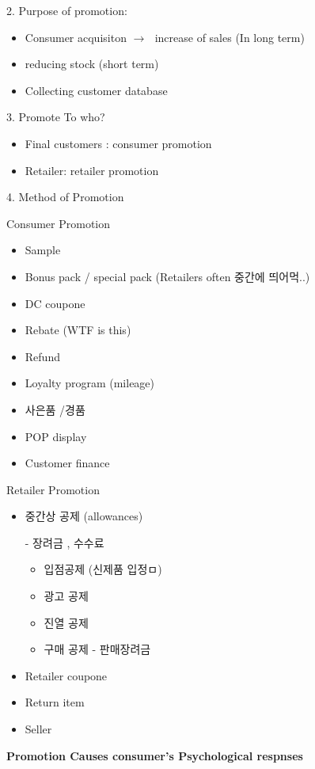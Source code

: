 \documentclass[12pt]{article}
\newcommand{\ra}{$\rightarrow \text{ }$}
\newcommand{\tb}{\textbf}
\begin{document}
\begin{itemize}
2. Purpose of promotion:
\begin{itemize}
	\item Consumer acquisiton \ra increase of sales (In long term)
	\item reducing stock (short term)
	\item Collecting customer database
\end{itemize}

3. Promote To who?

\begin{itemize}
	\item Final customers : consumer promotion
	\item Retailer: retailer promotion
\end{itemize}

4. Method of Promotion

Consumer Promotion
\begin{itemize}
	\item Sample
	\item Bonus pack / special pack (Retailers often 중간에 띄어먹..)
	\item DC coupone
	\item Rebate (WTF is this)
	\item Refund
	\item Loyalty program (mileage)
	\item 사은품 /경품
	\item POP display
	\item Customer finance
\end{itemize}

Retailer Promotion

\begin{itemize}
	\item 중간상 공제 (allowances)

	- 장려금 , 수수료
	\begin{itemize}
		\item 입점공제 (신제품 입정ㅁ)
		\item 광고 공제
		\item 진열 공제
		\item 구매 공제 - 판매장려금
	\end{itemize}
	\item Retailer coupone
	\item Return item
	\item Seller
\end{itemize}

\tb{Promotion Causes consumer's Psychological respnses}


\end{itemize}
\end{document}

